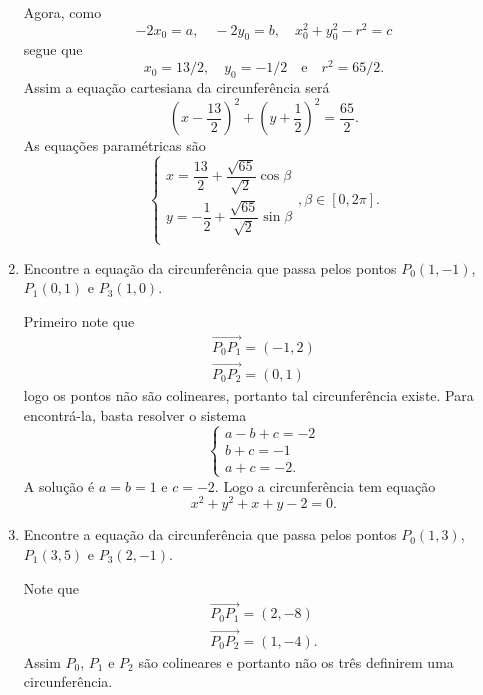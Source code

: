 \begin{exemplos}
\begin{enumerate}
\begin{solucao}
      Agora, como
      \[
        -2x_0 = a,\quad -2y_0 = b,\quad x_0^2 + y_0^2 - r^2 = c
      \]
      segue que
      \[
        x_0 = 13/2,\quad y_0 = -1/2 \quad\mbox{e}\quad r^2 = 65/2.
      \]
      Assim a equa\c{c}\~ao cartesiana da circunfer\^encia ser\'a
    \[
      \left(x - \dfrac{13}{2}\right)^2 + \left(y + \dfrac{1}{2}\right)^2 = \dfrac{65}{2}.
    \]
    As equa\c{c}\~oes param\'etricas s\~ao
    \[
      \begin{cases}
        x = \dfrac{13}{2} + \dfrac{\sqrt{65}}{\sqrt{2}}\cos\beta\\
        y = -\dfrac{1}{2} + \dfrac{\sqrt{65}}{\sqrt{2}}\sin\beta\\
      \end{cases}, \beta \in [0,2\pi].
    \]
    \end{solucao}
    \item Encontre a equa\c{c}\~ao da circunfer\^encia que passa pelos pontos $P_0(1,-1)$, $P_1(0,1)$ e $P_3(1,0)$.
    \begin{solucao}
      Primeiro note que
      \begin{align*}
        \vec{P_0P_1} = (-1,2)\\
        \vec{P_0P_2} = (0,1)
      \end{align*}
      logo os pontos n\~ao s\~ao colineares, portanto tal circunfer\^encia existe. Para encontr\'a-la, basta resolver o sistema
      \[
        \begin{cases}
          a - b + c = -2\\
          b + c = -1\\
          a + c = -2.
        \end{cases}
      \]
      A solu\c{c}\~ao \'e $a = b = 1$ e $c = -2$. Logo a circunfer\^encia tem equa\c{c}\~ao
      \[
        x^2 + y^2 + x + y - 2 = 0.
      \]
    \end{solucao}
    \item Encontre a equa\c{c}\~ao da circunfer\^encia que passa pelos pontos $P_0(1,3)$, $P_1(3,5)$ e $P_3(2,-1)$.
    \begin{solucao}
      Note que
      \begin{align*}
        \vec{P_0P_1} = (2, -8)\\
        \vec{P_0P_2} = (1, -4).
      \end{align*}
      Assim $P_0$, $P_1$ e $P_2$ s\~ao colineares e portanto n\~ao os tr\^es definirem uma circunfer\^encia.
    \end{solucao}
  \end{enumerate}
\end{exemplos}

